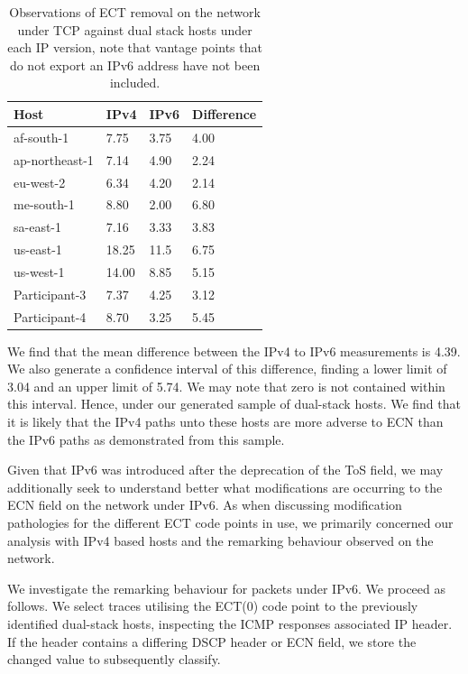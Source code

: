 \documentclass{l4proj}
\begin{document}
\begin{table}[H]
\centering
\begin{tabular}{|l|l|l|l|}
\hline
Host           & IPv4  & IPv6 & Difference \\ \hline
af-south-1     & 7.75  & 3.75 & 4.00      \\ \hline
ap-northeast-1 & 7.14  & 4.90 & 2.24       \\ \hline
eu-west-2      & 6.34  & 4.20 & 2.14       \\ \hline
me-south-1     & 8.80  & 2.00 & 6.80        \\ \hline
sa-east-1      & 7.16  & 3.33 & 3.83       \\ \hline
us-east-1      & 18.25 & 11.5 & 6.75       \\ \hline
us-west-1      & 14.00 & 8.85 & 5.15       \\ \hline
Participant-3   & 7.37  & 4.25 & 3.12       \\ \hline
Participant-4  & 8.70  & 3.25 & 5.45       \\ \hline
\end{tabular}
\caption{Observations of ECT removal on the network under TCP against dual stack hosts under each IP version, note that vantage points that do not export an IPv6 address have not been included.}
\label{tab:ip46}
\end{table}

We find that the mean difference between the IPv4 to IPv6 measurements is 4.39. We also generate a confidence interval of this difference, finding a lower limit of 3.04 and an upper limit of 5.74. We may note that zero is not contained within this interval. Hence, under our generated sample of dual-stack hosts. We find that it is likely that the IPv4 paths unto these hosts are more adverse to ECN than the IPv6 paths as demonstrated from this sample.

Given that IPv6 was introduced after the deprecation of the ToS field, we may additionally seek to understand better what modifications are occurring to the ECN field on the network under IPv6. As when discussing modification pathologies for the different ECT code points in use, we primarily concerned our analysis with IPv4 based hosts and the remarking behaviour observed on the network.

We investigate the remarking behaviour for packets under IPv6. We proceed as follows. We select traces utilising the ECT(0) code point to the previously identified dual-stack hosts, inspecting the ICMP responses associated IP header. If the header contains a differing DSCP header or ECN field, we store the changed value to subsequently classify. 
\end{document}
